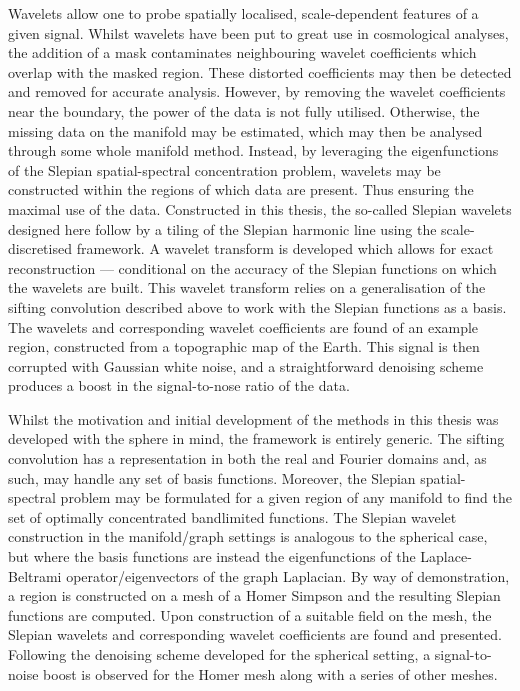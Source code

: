Wavelets allow one to probe spatially localised, scale-dependent features of a given signal.
Whilst wavelets have been put to great use in cosmological analyses, the addition of a mask contaminates neighbouring wavelet coefficients which overlap with the masked region.
These distorted coefficients may then be detected and removed for accurate analysis.
However, by removing the wavelet coefficients near the boundary, the power of the data is not fully utilised.
Otherwise, the missing data on the manifold may be estimated, which may then be analysed through some whole manifold method.
Instead, by leveraging the eigenfunctions of the Slepian spatial-spectral concentration problem, wavelets may be constructed within the regions of which data are present.
Thus ensuring the maximal use of the data.
Constructed in this thesis, the so-called Slepian wavelets designed here follow by a tiling of the Slepian harmonic line using the scale-discretised framework.
A wavelet transform is developed which allows for exact reconstruction --- conditional on the accuracy of the Slepian functions on which the wavelets are built.
This wavelet transform relies on a generalisation of the sifting convolution described above to work with the Slepian functions as a basis.
The wavelets and corresponding wavelet coefficients are found of an example region, constructed from a topographic map of the Earth.
This signal is then corrupted with Gaussian white noise, and a straightforward denoising scheme produces a boost in the signal-to-nose ratio of the data.

Whilst the motivation and initial development of the methods in this thesis was developed with the sphere in mind, the framework is entirely generic.
The sifting convolution has a representation in both the real and Fourier domains and, as such, may handle any set of basis functions.
Moreover, the Slepian spatial-spectral problem may be formulated for a given region of any manifold to find the set of optimally concentrated bandlimited functions.
The Slepian wavelet construction in the manifold/graph settings is analogous to the spherical case, but where the basis functions are instead the eigenfunctions of the Laplace-Beltrami operator/eigenvectors of the graph Laplacian.
By way of demonstration, a region is constructed on a mesh of a Homer Simpson and the resulting Slepian functions are computed.
Upon construction of a suitable field on the mesh, the Slepian wavelets and corresponding wavelet coefficients are found and presented.
Following the denoising scheme developed for the spherical setting, a signal-to-noise boost is observed for the Homer mesh along with a series of other meshes.
